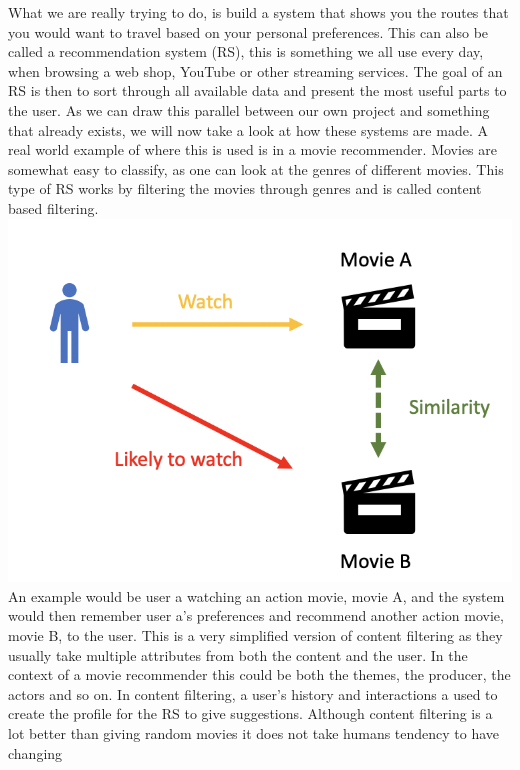 What we are really trying to do, is build a system that shows you the routes that you would want to travel based on your
personal preferences.
This can also be called a recommendation system (RS), this is something we all use every day, when browsing a web shop,
YouTube or other streaming services.
The goal of an RS is then to sort through all available data and present the most useful parts to the user.
As we can draw this parallel between our own project and something that already exists, we will now take a look at how
these systems are made.
\vspace{5mm}
A real world example of where this is used is in a movie recommender.
Movies are somewhat easy to classify, as one can look at the genres of different movies.
This type of RS works by filtering the movies through genres and is called content based filtering. \newline
\includegraphics[width =\textwidth]{images/content-filtering}
An example would be user a watching an action movie, movie A, and the system would then remember user a's preferences
and recommend another action movie, movie B, to the user.
\newline
This is a very simplified version of content filtering as they usually take multiple attributes from both the content
and the user.
In the context of a movie recommender this could be both the themes, the producer, the actors and so on.
\newline
In content filtering, a user's history and interactions a used to create the profile for the RS to give suggestions.
Although content filtering is a lot better than giving random movies it does not take humans tendency to have changing
